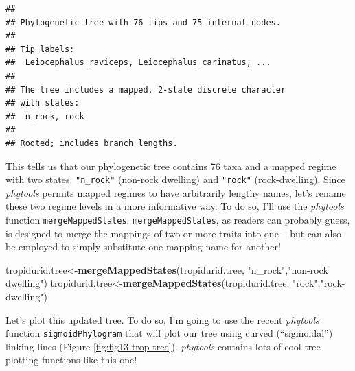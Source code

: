 \documentclass[fleqn,10pt,lineno]{wlpeerj} %
\newenvironment{Shaded}{\begin{snugshade}}{\end{snugshade}}
\newcommand{\FunctionTok}[1]{\textcolor[rgb]{0.13,0.29,0.53}{\textbf{#1}}}
\newcommand{\NormalTok}[1]{#1}
\newcommand{\OtherTok}[1]{\textcolor[rgb]{0.56,0.35,0.01}{#1}}
\newcommand{\StringTok}[1]{\textcolor[rgb]{0.31,0.60,0.02}{#1}}
\begin{document}
\begin{verbatim}
## 
## Phylogenetic tree with 76 tips and 75 internal nodes.
## 
## Tip labels:
##  Leiocephalus_raviceps, Leiocephalus_carinatus, ...
## 
## The tree includes a mapped, 2-state discrete character
## with states:
##  n_rock, rock
## 
## Rooted; includes branch lengths.
\end{verbatim}

This tells us that our phylogenetic tree contains 76 taxa and a mapped regime with two states: \texttt{"n\_rock"} (non-rock dwelling) and \texttt{"rock"} (rock-dwelling). Since \emph{phytools} permits mapped regimes to have arbitrarily lengthy names, let's rename these two regime levels in a more informative way. To do so, I'll use the \emph{phytools} function \texttt{mergeMappedStates}. \texttt{mergeMappedStates}, as readers can probably guess, is designed to merge the mappings of two or more traits into one -- but can also be employed to simply substitute one mapping name for another!

\begin{Shaded}
\begin{Highlighting}[]
\NormalTok{tropidurid.tree}\OtherTok{\textless{}{-}}\FunctionTok{mergeMappedStates}\NormalTok{(tropidurid.tree,}
  \StringTok{"n\_rock"}\NormalTok{,}\StringTok{"non{-}rock dwelling"}\NormalTok{)}
\NormalTok{tropidurid.tree}\OtherTok{\textless{}{-}}\FunctionTok{mergeMappedStates}\NormalTok{(tropidurid.tree,}
  \StringTok{"rock"}\NormalTok{,}\StringTok{"rock{-}dwelling"}\NormalTok{)}
\end{Highlighting}
\end{Shaded}

Let's plot this updated tree. To do so, I'm going to use the recent \emph{phytools} function \texttt{sigmoidPhylogram} that will plot our tree using curved (``sigmoidal'') linking lines (Figure \ref{fig:fig13-trop-tree}). \emph{phytools} contains lots of cool tree plotting functions like this one!
\end{document}
